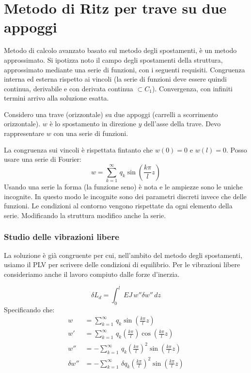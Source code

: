 \section{Metodo di Ritz per trave su due appoggi}

Metodo di calcolo avanzato basato sul metodo degli spostamenti, è un metodo approssimato.
Si ipotizza noto il campo degli spostamenti della struttura, approssimato mediante una serie di funzioni, con i seguenti requisiti. Congruenza interna ed esterna rispetto ai vincoli (la serie di funzioni deve essere quindi continua, derivabile e con derivata continua $\subset C_1$). Convergenza, con infiniti termini arrivo alla soluzione esatta.

Considero una trave (orizzontale) su due appoggi (carrelli a scorrimento orizzontale). $w$ è lo spostamento in direzione $y$ dell'asse della trave. Devo rappresentare  $w$ con una serie di funzioni.

La congruenza sui vincoli è rispettata fintanto che $w(0)=0$ e $w(l)=0$. Posso usare una serie di Fourier:
\begin{equation*}
    w= \sum^\infty_{k=1}\,q_k\sin{\left(\frac{k\pi}{l}z\right)}
\end{equation*}
Usando una serie la forma (la funzione seno) è nota e le ampiezze sono le uniche incognite. In questo modo le incognite sono dei parametri discreti invece che delle funzioni. Le condizioni al contorno vengono rispettate da ogni elemento della serie. Modificando la struttura modifico anche la serie.

\subsubsection*{Studio delle vibrazioni libere}
La soluzione è già congruente per cui, nell'ambito del metodo degli spostamenti, usiamo il PLV per scrivere delle condizioni di equilibrio. Per le vibrazioni libere consideriamo anche il lavoro compiuto dalle forze d'inerzia.

\begin{equation*}
    \delta L_d=\int_0^l \,EJ \,w''\delta w''\,dz
\end{equation*}
Specificando che:
\begin{align*}
    w&= \sum^\infty_{k=1}\,q_k\sin{\left(\frac{k\pi}{l}z\right)}\\
      w'&= \sum^\infty_{k=1}\,q_k   \left(\frac{k\pi}{l}\right)  \cos{\left(\frac{k\pi}{l}z\right)}\\
       w''&=- \sum^\infty_{k=1}\,q_k   \left(\frac{k\pi}{l}\right)^2  \sin{\left(\frac{k\pi}{l}z\right)}\\
        \delta w''&=- \sum^\infty_{k=1}\,\delta q_k   \left(\frac{k\pi}{l}\right)^2  \sin{\left(\frac{k\pi}{l}z\right)}
\end{align*}

